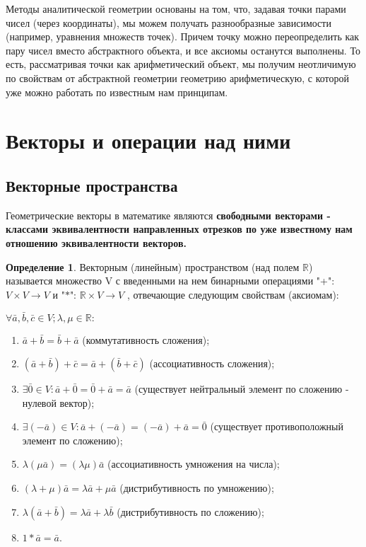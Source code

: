 \documentclass[a4paper, 12pt]{article}
\theoremstyle{definition}
\newtheorem*{definition}{Определение}
\begin{document}
	Методы аналитической геометрии основаны на том, что, задавая точки парами чисел (через координаты), мы можем получать разнообразные зависимости (например, уравнения множеств точек). Причем точку можно переопределить как пару чисел вместо абстрактного объекта, и все аксиомы останутся выполнены. То есть, рассматривая точки как арифметический объект, мы получим неотличимую по свойствам от абстрактной геометрии геометрию арифметическую, с которой уже можно работать по известным нам принципам.
	
	\section{Векторы и операции над ними}
	\subsection{Векторные пространства}
	Геометрические векторы в математике являются \bfseries свободными векторами \mdseries - классами эквивалентности направленных отрезков по уже известному нам отношению эквивалентности векторов.
	\begin{definition}
		Векторным (линейным) пространством (над полем $\mathbb{R}$) называется множество V с введенными на нем бинарными операциями "+": $V \times V \rightarrow V$ и "$*$": $\mathbb{R} \times V \rightarrow V$ , отвечающие следующим свойствам (аксиомам):
		
		$\forall \bar{a}, \bar{b}, \bar{c} \in V; \lambda, \mu \in \mathbb{R}:$
		\begin{enumerate}
			\item $\bar{a} + \bar{b} = \bar{b} + \bar{a}$ (коммутативность сложения);
			\item $(\bar{a} + \bar{b}) + \bar{c} = \bar{a} + (\bar{b} + \bar{c})$ (ассоциативность сложения);
			\item $\exists \bar{0} \in V: \bar{a} + \bar{0} = \bar{0} + \bar{a} = \bar{a}$ (существует нейтральный элемент по сложению - нулевой вектор);
			\item $\exists (-\bar{a}) \in V: \bar{a} + (-\bar{a}) = (-\bar{a}) + \bar{a} = \bar{0}$ (существует противоположный элемент по сложению);
			\item $\lambda(\mu\bar{a}) = (\lambda\mu)\bar{a}$ (ассоциативность умножения на числа);
			\item $(\lambda + \mu)\bar{a} = \lambda\bar{a}+ \mu\bar{a}$ (дистрибутивность по умножению);
			\item $\lambda(\bar{a} + \bar{b}) = \lambda\bar{a}+ \lambda\bar{b}$ (дистрибутивность по сложению);
			\item $1*\bar{a} = \bar{a}$.
		\end{enumerate}
	\end{definition}
\end{document}
